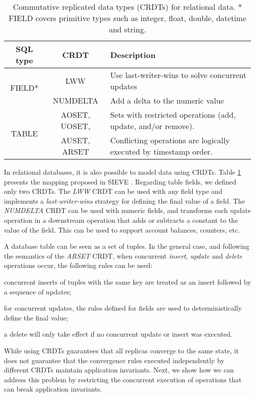 \begin{table}[t!]
\small
\centering
\begin{tabular}{|c|c|p{9.3cm}|}
\hline
SQL type & CRDT & Description \\
\hline
\hline
\multirow{2}{*}{FIELD*} & LWW &  Use last-writer-wins to solve concurrent updates\\\cline{2-3}
 & NUMDELTA  &  Add a delta to the numeric value \\\hline
\multirow{2}{*}{TABLE} & AOSET,                       UOSET,       & Sets with restricted operations (add, update, and/or remove). \\
& AUSET,              ARSET & Conflicting operations are logically executed by timestamp order.\\
\hline
\end{tabular}
\caption{Commutative replicated data types (CRDTs) for relational data. *
FIELD covers primitive types such as integer, float, double, datetime and string.}
\label{tab:crdts}
\end{table}

In relational databases, it is also possible to model data using CRDTs.
Table \ref{tab:crdts} presents the mapping proposed in SIEVE \cite{Li14Automating}.
Regarding table fields, we defined only two CRDTs. The \emph{LWW} CRDT can be
used with any field type and implements a \emph{last-writer-wins} strategy
for defining the final value of a field.
The \emph{NUMDELTA} CRDT can be used with numeric fields, and transforms each
update operation in a downstream operation that adds or subtracts
a constant to the value of the field.
This can be used to support account balances,
counters, etc.

A database table can be seen as a set of tuples.
In the general case, and following the semantics of the \emph{ARSET} CRDT, when concurrent
\emph{insert}, \emph{update} and \emph{delete} operations occur,
the following rules can be used:
\begin{inparaenum}[(1)]
\item concurrent inserts of tuples with the same key are treated as an insert followed
by a sequence of updates;
\item for concurrent updates, the rules defined for fields
are used to deterministically define the final value;
\item a delete will only take effect if no concurrent update or insert was executed.
\end{inparaenum}

While using CRDTs guarantees that all replicas converge to the same state, it does
not guarantee that the convergence rules executed independently by different CRDTs
maintain application invariants. Next, we show how we can address
this problem by restricting the concurrent execution of operations that can break
application invariants.




